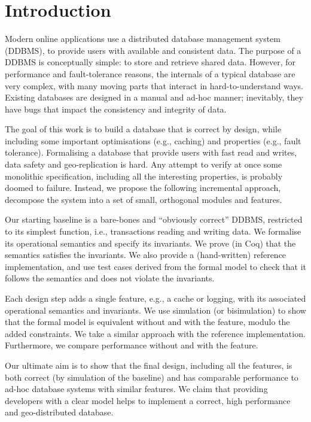 \documentclass[systeme,french,english]{compas2022}
\begin{document}
\section{Introduction}

Modern online applications use a distributed database management
system (DDBMS), to provide users with available and consistent data.
The purpose of a DDBMS is conceptually simple: to store and retrieve
shared data.
However, for performance and fault-tolerance reasons, the internals of a
typical database are very complex, with many moving parts that interact
in hard-to-understand ways.
Existing databases are designed in a manual and ad-hoc manner;
inevitably, they have bugs that impact the consistency and integrity of
data.

The goal of this work is to build a database that is correct by design,
while including some important optimisations (e.g., caching)
and properties (e.g., fault tolerance).
Formalising a database that provide users with fast read and writes,
data safety and geo-replication is hard.
Any attempt to verify at once some monolithic specification, including
all the interesting properties, is probably doomed to failure.
Instead, we propose the following incremental approach,  decompose the
system into a set of small, orthogonal modules and features.

Our starting baseline is a bare-bones and ``obviously correct'' DDBMS,
restricted to its simplest function, i.e., transactions reading and
writing data.
We formalise its operational semantics and specify its invariants.
We prove (in Coq) that the semantics satisfies the invariants.
We also provide a (hand-written) reference implementation, and use test
cases derived from the formal model to check that it follows the
semantics and does not violate the invariants.

Each design step adds a single feature, e.g., a cache or logging,
with its associated operational semantics and invariants.
We use simulation (or bisimulation) to show that the formal model is
equivalent without and with the feature, modulo the added constraints.
We take a similar approach with the reference implementation.
Furthermore, we compare performance without and with the feature.

Our ultimate aim is to show that the final design, including all the
features, is both correct (by simulation of the baseline) and has
comparable performance to ad-hoc database systems with similar features.
We claim that providing developers with a clear model helps to implement
a correct, high performance and geo-distributed database.
\end{document}
